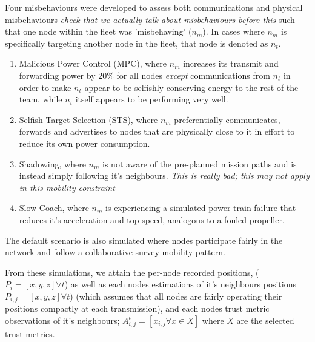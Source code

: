 \documentclass{aamas2016}
\begin{document}
Four misbehaviours were developed to assess both communications and physical misbehaviours \textit{check that we actually talk about misbehaviours before this} such that one node within the fleet was 'misbehaving' ($n_m$). In cases where $n_m$ is specifically targeting another node in the fleet, that node is denoted as $n_t$.

\begin{enumerate}
	\item Malicious Power Control (MPC), where $n_m$ increases its transmit and forwarding power by 20\% for all nodes \emph{except} communications from $n_t$ in order to make $n_t$ appear to be selfishly conserving energy to the rest of the team, while $n_t$ itself appears to be performing very well.
	\item Selfish Target Selection (STS), where $n_m$ preferentially communicates, forwards and advertises to nodes that are physically close to it in effort to reduce its own power consumption.
	\item Shadowing, where $n_m$ is not aware of the pre-planned mission paths and is instead simply following it's neighbours. \textit{This is really bad; this may not apply in this mobility constraint}
	\item Slow Coach, where $n_m$ is experiencing a simulated power-train failure that reduces it's acceleration and top speed, analogous to a fouled propeller. 
\end{enumerate}

The default scenario is also simulated where nodes participate fairly in the network and follow a collaborative survey mobility pattern.

From these simulations, we attain the per-node recorded positions, ($P_i = [x,y,z] \forall t$) as well as each nodes estimations of it's neighbours positions $P_{i,j} = [x,y,z] \forall t$) (which assumes that all nodes are fairly operating their positions compactly at each transmission), and each nodes trust metric observations of it's neighbours; $A_{i,j}^t = [ x_{i,j} \forall x \in X ] $ where $X$ are the selected trust metrics.
\end{document}

